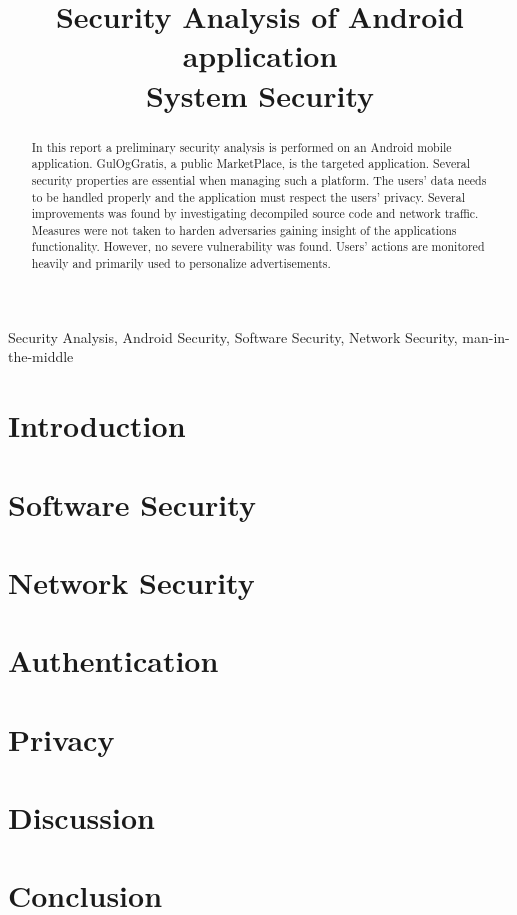 \documentclass[conference]{IEEEtran}
\begin{document}
\title{Security Analysis of Android application\\
{\footnotesize System Security}}

\author{
}

\maketitle

\begin{abstract}
In this report a preliminary security analysis is performed on an Android mobile application. GulOgGratis, a public MarketPlace, is the targeted application. Several security properties are essential when managing such a platform. The users' data needs to be handled properly and the application must respect the users' privacy. Several improvements was found by investigating decompiled source code and network traffic. Measures were not taken to harden adversaries gaining insight of the applications functionality. However, no severe vulnerability was found. Users' actions are monitored heavily and primarily used to personalize advertisements.
\end{abstract}

\begin{IEEEkeywords}
Security Analysis, Android Security, Software Security, Network Security, man-in-the-middle
\end{IEEEkeywords}

\section{Introduction}


\section{Software Security}


\section{Network Security}


\section{Authentication}


\section{Privacy}


\section{Discussion}


\section{Conclusion}


\printbibliography
\end{document}
